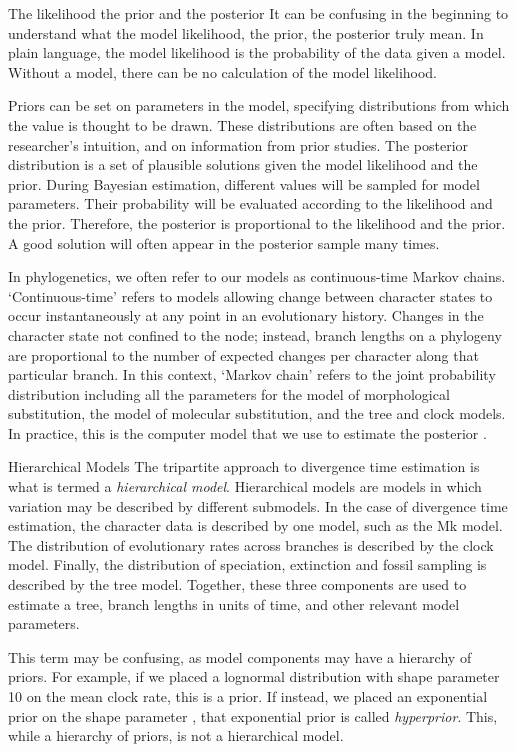 \begin{boxedtext}{The likelihood the prior and the posterior} 
It can be confusing in the beginning to understand what the model likelihood, the prior,  the posterior truly mean.
In plain language, the model likelihood is the probability of the data given a model.
Without a model, there can be no calculation of the model  likelihood.

Priors can be set on parameters in the model, specifying distributions from which the value is thought to be drawn.
These distributions are often based on the researcher's intuition, and on information from prior studies.
The posterior distribution is a set of plausible solutions given the model likelihood and the prior.
During Bayesian estimation, different values will be sampled for model parameters.
Their probability will be evaluated according to the likelihood and the prior.
Therefore, the posterior is proportional to the likelihood and the prior.
A good solution will often appear in the posterior sample many times.

In phylogenetics, we often refer to our models as continuous-time Markov chains.
`Continuous-time' refers to models allowing change between character states to occur instantaneously at any point in an evolutionary history.
Changes in the character state  not confined to the node; instead, branch lengths on a phylogeny are proportional to the number of expected changes per character along that particular branch. 
In this context, `Markov chain' refers to the  joint probability distribution including all the parameters for the model of morphological substitution, the model of molecular substitution, and the tree and clock models. 
In practice, this is the computer model that we use to estimate the posterior \cite{Hoehna2016b}.
\end{boxedtext}

\begin{boxedtext}{Hierarchical Models}
The tripartite approach to divergence time estimation is what is termed a \textit{hierarchical model}. 
Hierarchical models are models in which variation may be described by different submodels.
In the case of divergence time estimation, the character data  is described by one model, such as the Mk model.
The distribution of evolutionary rates across branches is described by the clock model.
Finally, the distribution of speciation, extinction and fossil sampling is described by the tree model.
Together, these three components are used to estimate a tree, branch lengths in units of time, and other relevant model parameters.

This term may be confusing, as model components may have a hierarchy of priors. 
For example, if we placed a lognormal distribution with shape parameter 10 on the mean clock rate, this is a prior.
If instead, we placed an exponential prior on the shape parameter , that exponential prior is called \textit{hyperprior}.
This, while a hierarchy of priors, is not a hierarchical model. 
\end{boxedtext}

